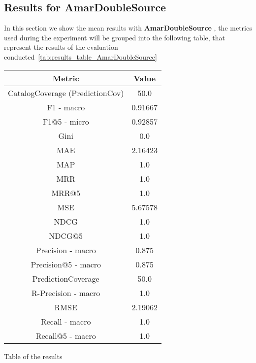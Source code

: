 \documentclass[11pt]{article}
\begin{document}
\subsection{Results for AmarDoubleSource}\label{subsec:AmarDoubleSource}
In this section we show the mean results with \textbf{ AmarDoubleSource }, the metrics used during the experiment will be
grouped into the following table, that represent the results of the evaluation conducted~\ref{tab:results_table_AmarDoubleSource}

\begin{center}
    \begin{tabular}{|c|c|}
        \hline
        \textbf{Metric} & \textbf{Value} \\ \hline
                CatalogCoverage (PredictionCov) & 50.0 \\ \hline
                F1 - macro & 0.91667 \\ \hline
                F1@5 - micro & 0.92857 \\ \hline
                Gini & 0.0 \\ \hline
                MAE & 2.16423 \\ \hline
                MAP & 1.0 \\ \hline
                MRR & 1.0 \\ \hline
                MRR@5 & 1.0 \\ \hline
                MSE & 5.67578 \\ \hline
                NDCG & 1.0 \\ \hline
                NDCG@5 & 1.0 \\ \hline
                Precision - macro & 0.875 \\ \hline
                Precision@5 - macro & 0.875 \\ \hline
                PredictionCoverage & 50.0 \\ \hline
                R-Precision - macro & 1.0 \\ \hline
                RMSE & 2.19062 \\ \hline
                Recall - macro & 1.0 \\ \hline
                Recall@5 - macro & 1.0 \\ \hline
             \end{tabular}
    \captionsetup{type=table}
    \caption{Table of the results}
    \label{tab:results_table_AmarDoubleSource}
\end{center}
\hfill\break
\hfill\break
\end{document}
